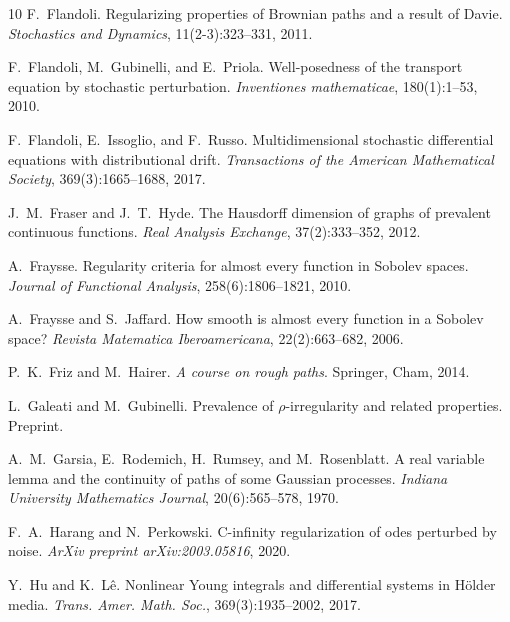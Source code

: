 \documentclass[10pt]{article}
\newcommand{\tmtextit}[1]{{\itshape{#1}}}
\begin{document}
\begin{thebibliography}{10}
  F.~Flandoli. {\newblock}Regularizing properties of
  Brownian paths and a result of Davie. {\newblock}\tmtextit{Stochastics and
  Dynamics}, 11(2-3):323--331, 2011.{\newblock}
  
  F.~Flandoli, M.~Gubinelli, and  E.~Priola.
  {\newblock}Well-posedness of the transport equation by stochastic
  perturbation. {\newblock}\tmtextit{Inventiones mathematicae}, 180(1):1--53,
  2010.{\newblock}
  
  F.~Flandoli, E.~Issoglio, and  F.~Russo.
  {\newblock}Multidimensional stochastic differential equations with
  distributional drift. {\newblock}\tmtextit{Transactions of the American
  Mathematical Society}, 369(3):1665--1688, 2017.{\newblock}
  
  J.~M.~Fraser  and  J.~T.~Hyde. {\newblock}The
  Hausdorff dimension of graphs of prevalent continuous functions.
  {\newblock}\tmtextit{Real Analysis Exchange}, 37(2):333--352,
  2012.{\newblock}
  
  A.~Fraysse. {\newblock}Regularity criteria for
  almost every function in Sobolev spaces. {\newblock}\tmtextit{Journal of
  Functional Analysis}, 258(6):1806--1821, 2010.{\newblock}
  
  A.~Fraysse  and  S.~Jaffard. {\newblock}How smooth
  is almost every function in a Sobolev space? {\newblock}\tmtextit{Revista
  Matematica Iberoamericana}, 22(2):663--682, 2006.{\newblock}
  
  P.~K.~Friz  and  M.~Hairer. {\newblock}\tmtextit{A
  course on rough paths}. {\newblock}Springer, Cham, 2014.{\newblock}
  
  L.~Galeati  and  M.~Gubinelli.
  {\newblock}Prevalence of $\rho$-irregularity and related properties.
  {\newblock}Preprint.{\newblock}
  
  A.~M.~Garsia, E.~Rodemich, H.~Rumsey, and 
  M.~Rosenblatt. {\newblock}A real variable lemma and the continuity of paths
  of some Gaussian processes. {\newblock}\tmtextit{Indiana University
  Mathematics Journal}, 20(6):565--578, 1970.{\newblock}
  
  F.~A.~Harang  and  N.~Perkowski.
  {\newblock}C-infinity regularization of odes perturbed by noise.
  {\newblock}\tmtextit{ArXiv preprint arXiv:2003.05816}, 2020.{\newblock}
  
  Y.~Hu  and  K.~L{\^e}. {\newblock}Nonlinear Young integrals
  and differential systems in H{\"o}lder media. {\newblock}\tmtextit{Trans.
  Amer. Math. Soc.}, 369(3):1935--2002, 2017.{\newblock}
  

\end{thebibliography}
\end{document}
